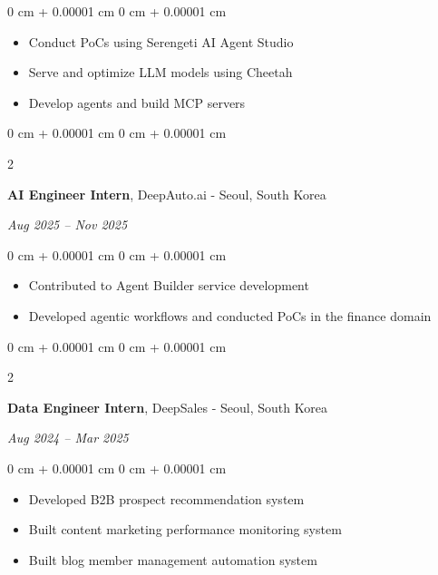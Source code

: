 \documentclass[10pt, letterpaper]{article}
\newenvironment{highlights}{
    \begin{itemize}[
        topsep=0.10 cm,
        parsep=0.10 cm,
        partopsep=0pt,
        itemsep=0pt,
        leftmargin=0 cm + 10pt
    ]
}{
    \end{itemize}
} %
\newenvironment{onecolentry}{
    \begin{adjustwidth}{
        0 cm + 0.00001 cm
    }{
        0 cm + 0.00001 cm
    }
}{
    \end{adjustwidth}
} %
\newenvironment{twocolentry}[2][]{
    \onecolentry
    \def\secondColumn{\textit{#2}}
    \setcolumnwidth{\fill, 4.5 cm}
    \begin{paracol}{2}
}{
    \switchcolumn \raggedleft \secondColumn
    \end{paracol}
    \endonecolentry
} %
\begin{document}
        \vspace{0.10 cm}
        \begin{onecolentry}
            \begin{highlights}
                \item Conduct PoCs using Serengeti AI Agent Studio
                \item Serve and optimize LLM models using Cheetah
                \item Develop agents and build MCP servers
            \end{highlights}
        \end{onecolentry}
        
        \vspace{0.2 cm}
        \begin{twocolentry}{
            Aug 2025 -- Nov 2025
        }
            \textbf{AI Engineer Intern}, DeepAuto.ai - Seoul, South Korea
        \end{twocolentry}

        \vspace{0.10 cm}
        \begin{onecolentry}
            \begin{highlights}
                \item Contributed to Agent Builder service development
                \item Developed agentic workflows and conducted PoCs in the finance domain
            \end{highlights}
        \end{onecolentry}

        \vspace{0.2 cm}
        \begin{twocolentry}{
            Aug 2024 -- Mar 2025
        }
            \textbf{Data Engineer Intern}, DeepSales - Seoul, South Korea
        \end{twocolentry}

        \vspace{0.10 cm}
        \begin{onecolentry}
            \begin{highlights}
                \item Developed B2B prospect recommendation system
                \item Built content marketing performance monitoring system
                \item Built blog member management automation system
            \end{highlights}
        \end{onecolentry}
\end{document}
